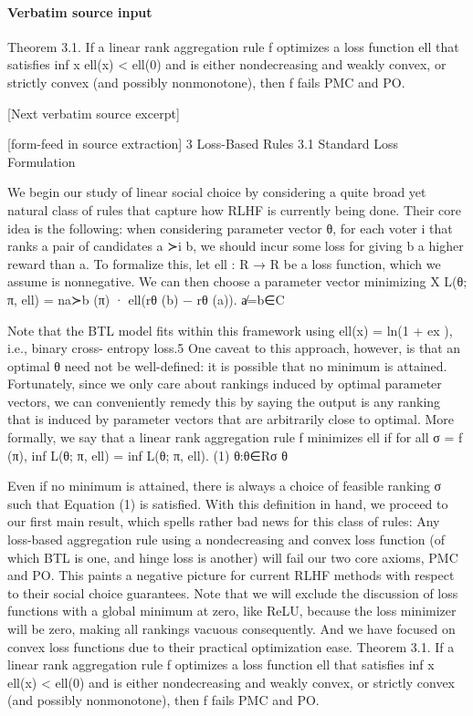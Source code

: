 \documentclass[10pt]{article}
\begin{document}
\paragraph{Verbatim source input}
\begin{ReviewVerbatim}
Theorem 3.1. If a linear rank aggregation rule f optimizes a loss function ell that satisfies
inf x ell(x) < ell(0) and is either nondecreasing and weakly convex, or strictly convex (and possibly
nonmonotone), then f fails PMC and PO.

[Next verbatim source excerpt]


[form-feed in source extraction]
3         Loss-Based Rules
3.1       Standard Loss Formulation

We begin our study of linear social choice by considering a quite broad yet natural class of rules
that capture how RLHF is currently being done. Their core idea is the following: when considering
parameter vector θ, for each voter i that ranks a pair of candidates a ≻i b, we should incur some
loss for giving b a higher reward than a. To formalize this, let ell : R → R be a loss function, which
we assume is nonnegative. We can then choose a parameter vector minimizing
                                         X
                           L(θ; π, ell) =       na≻b (π) · ell(rθ (b) − rθ (a)).
                                             a̸=b∈C

Note that the BTL model fits within this framework using ell(x) = ln(1 + ex ), i.e., binary cross-
entropy loss.5 One caveat to this approach, however, is that an optimal θ need not be well-defined:
it is possible that no minimum is attained. Fortunately, since we only care about rankings induced
by optimal parameter vectors, we can conveniently remedy this by saying the output is any ranking
that is induced by parameter vectors that are arbitrarily close to optimal. More formally, we say that
a linear rank aggregation rule f minimizes ell if for all σ = f (π),
                                       inf L(θ; π, ell) = inf L(θ; π, ell).                                       (1)
                                     θ:θ∈Rσ                    θ

Even if no minimum is attained, there is always a choice of feasible ranking σ such that Equation (1)
is satisfied.
With this definition in hand, we proceed to our first main result, which spells rather bad news for
this class of rules: Any loss-based aggregation rule using a nondecreasing and convex loss function
(of which BTL is one, and hinge loss is another) will fail our two core axioms, PMC and PO. This
paints a negative picture for current RLHF methods with respect to their social choice guarantees.
Note that we will exclude the discussion of loss functions with a global minimum at zero, like ReLU,
because the loss minimizer will be zero, making all rankings vacuous consequently. And we have
focused on convex loss functions due to their practical optimization ease.
Theorem 3.1. If a linear rank aggregation rule f optimizes a loss function ell that satisfies
inf x ell(x) < ell(0) and is either nondecreasing and weakly convex, or strictly convex (and possibly
nonmonotone), then f fails PMC and PO.


\end{ReviewVerbatim}
\end{document}
